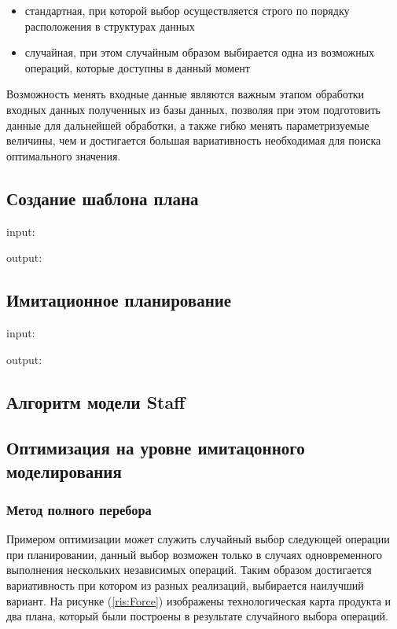 \begin{itemize}
    \item стандартная, при которой выбор осуществляется строго по порядку расположения в структурах данных
    \item случайная, при этом случайным образом выбирается одна из возможных операций, которые доступны в данный момент 
\end{itemize}

Возможность менять входные данные являются важным этапом обработки входных данных полученных из базы данных, позволяя при этом подготовить данные для дальнейшей обработки, а также гибко менять параметризуемые величины, чем и достигается большая вариативность необходимая для поиска оптимального значения. 

\subsection{Создание шаблона плана}


input:

output:

\subsection{Имитационное планирование}

input:

output:

\subsection{Алгоритм модели Staff}

\subsection{Оптимизация на уровне имитацонного моделирования}

\subsubsection{Метод полного перебора}
Примером оптимизации может служить случайный выбор следующей операции при планировании, данный выбор возможен только в случаях одновременного выполнения нескольких независимых операций. Таким образом достигается вариативность при котором из разных реализаций, выбирается наилучший вариант. На рисунке (\ref{ris:Force}) изображены технологическая карта продукта и два плана, который были построены в результате случайного выбора операций.

